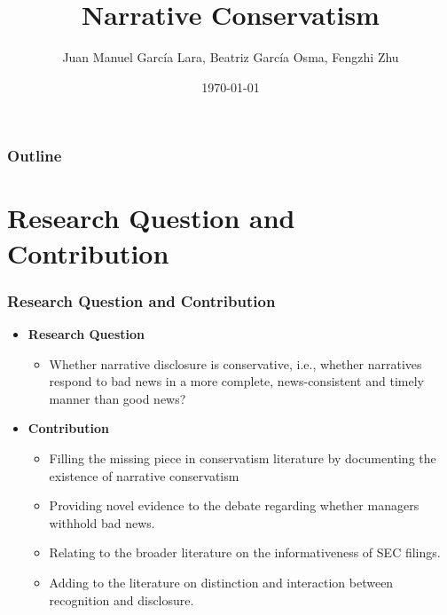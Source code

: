 \documentclass{beamer}
\title[Narrative Conservatism]{Narrative Conservatism} %
\author[]{Juan Manuel Garc\'ia Lara, Beatriz Garc\'ia Osma, Fengzhi Zhu} %
\institute[] %
{Universidad Carlos III de Madrid \\ %

	\medskip
	fzhu@emp.uc3m.es} %
\date{\today} %
\begin{document}
	
\begin{frame}
\titlepage %
\end{frame}

\begin{frame}
\frametitle{Outline}
\tableofcontents
\end{frame}

\section{Research Question and Contribution}

\begin{frame}
\frametitle{Research Question and Contribution}
\begin{itemize}
\item \textbf{Research Question}

\begin{itemize}
\item Whether narrative disclosure is conservative, i.e., whether narratives respond to bad news in a more complete, news-consistent and timely manner than good news?
\end{itemize}

\item \textbf{Contribution}

\begin{itemize}
	\item Filling the missing piece in conservatism literature by documenting the existence of narrative conservatism
	\item Providing novel evidence to the debate regarding whether managers withhold bad news. 
	\item Relating to the broader literature on the informativeness of SEC filings.
	\item Adding to the literature on distinction and interaction between recognition and disclosure.
\end{itemize}
\end{itemize}
\end{frame}
\end{document}
